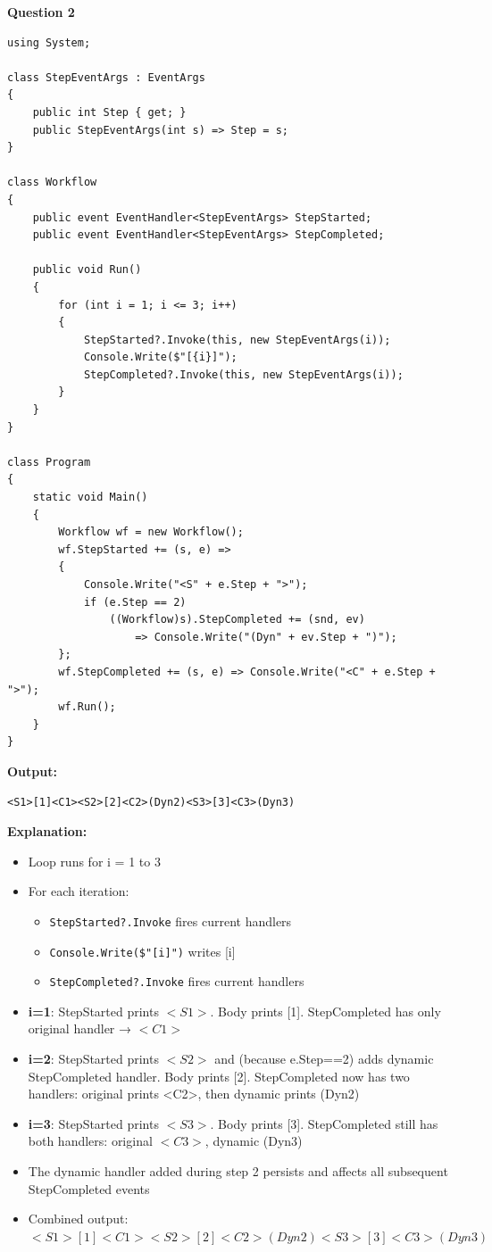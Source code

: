 \textbf{Question 2}

\begin{lstlisting}[language=CSharp, caption={Dynamic Event Subscription During Iteration}]
using System;

class StepEventArgs : EventArgs
{
    public int Step { get; }
    public StepEventArgs(int s) => Step = s;
}

class Workflow
{
    public event EventHandler<StepEventArgs> StepStarted;
    public event EventHandler<StepEventArgs> StepCompleted;

    public void Run()
    {
        for (int i = 1; i <= 3; i++)
        {
            StepStarted?.Invoke(this, new StepEventArgs(i));
            Console.Write($"[{i}]");
            StepCompleted?.Invoke(this, new StepEventArgs(i));
        }
    }
}

class Program
{
    static void Main()
    {
        Workflow wf = new Workflow();
        wf.StepStarted += (s, e) =>
        {
            Console.Write("<S" + e.Step + ">");
            if (e.Step == 2)
                ((Workflow)s).StepCompleted += (snd, ev)
                    => Console.Write("(Dyn" + ev.Step + ")");
        };
        wf.StepCompleted += (s, e) => Console.Write("<C" + e.Step + ">");
        wf.Run();
    }
}
\end{lstlisting}

\textbf{Output:}
\begin{verbatim}
<S1>[1]<C1><S2>[2]<C2>(Dyn2)<S3>[3]<C3>(Dyn3)
\end{verbatim}

\textbf{Explanation:}
\begin{itemize}
    \item Loop runs for i = 1 to 3
    \item For each iteration:
    \begin{itemize}
        \item \texttt{StepStarted?.Invoke} fires current handlers
        \item \texttt{Console.Write(\$"[{i}]")} writes [i]
        \item \texttt{StepCompleted?.Invoke} fires current handlers
    \end{itemize}
    \item \textbf{i=1}: StepStarted prints $<S1>$. Body prints [1]. StepCompleted has only original handler → $<C1>$
    \item \textbf{i=2}: StepStarted prints $<S2>$ and (because e.Step==2) adds dynamic StepCompleted handler. Body prints [2]. StepCompleted now has two handlers: original prints <C2>, then dynamic prints (Dyn2)
    \item \textbf{i=3}: StepStarted prints $<S3>$. Body prints [3]. StepCompleted still has both handlers: original $<C3>$, dynamic (Dyn3)
    \item The dynamic handler added during step 2 persists and affects all subsequent StepCompleted events
    \item Combined output: $<S1>[1]<C1><S2>[2]<C2>(Dyn2)<S3>[3]<C3>(Dyn3)$
\end{itemize}

